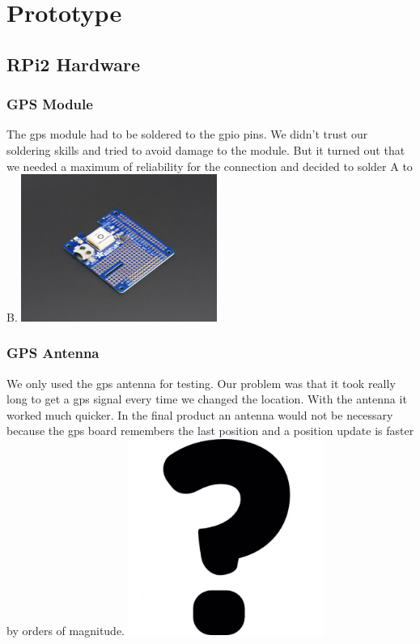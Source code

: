 \chapter{Prototype}
\section{RPi2 Hardware}
\subsection{GPS Module}
The \gls{gps} module had to be soldered to the \gls{gpio} pins. We didn't trust our soldering skills and tried to avoid damage to the module. But it turned out that we needed a maximum of reliability for the connection and decided to solder A to B.\newline
\includegraphics[width=0.48\textwidth]{bilder/GPS}
\subsection{GPS Antenna}
We only used the \gls{gps} antenna for testing. Our problem was that it took really long to get a \gls{gps} signal every time we changed the location. With the antenna it worked much quicker. In the final product an antenna would not be necessary because the gps board remembers the last position and a position update is faster by orders of magnitude.\newline 
\includegraphics[width=0.48\textwidth]{bilder/Antenna}
